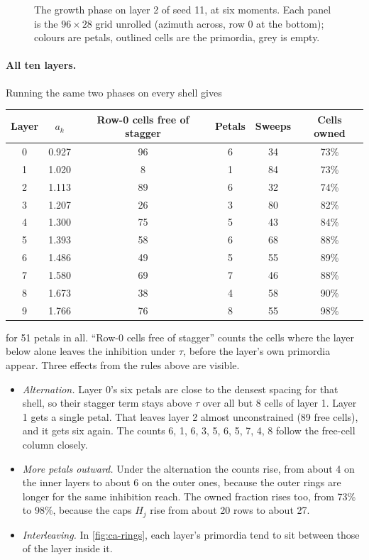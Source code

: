 \begin{figure}[ht]
\centering

\caption{The growth phase on layer 2 of seed 11, at six moments. Each panel is
the $96\times28$ grid unrolled (azimuth across, row 0 at the bottom); colours
are petals, outlined cells are the primordia, grey is empty.}
\label{fig:ca-sweeps}
\end{figure}

\paragraph{All ten layers.} Running the same two phases on every shell gives
\begin{center}\small
\begin{tabular}{@{}cccccc@{}}
\toprule
Layer & $a_k$ & Row-0 cells free of stagger & Petals & Sweeps & Cells owned \\
\midrule
0 & 0.927 & 96 & 6 & 34 & 73\% \\
1 & 1.020 & 8 & 1 & 84 & 73\% \\
2 & 1.113 & 89 & 6 & 32 & 74\% \\
3 & 1.207 & 26 & 3 & 80 & 82\% \\
4 & 1.300 & 75 & 5 & 43 & 84\% \\
5 & 1.393 & 58 & 6 & 68 & 88\% \\
6 & 1.486 & 49 & 5 & 55 & 89\% \\
7 & 1.580 & 69 & 7 & 46 & 88\% \\
8 & 1.673 & 38 & 4 & 58 & 90\% \\
9 & 1.766 & 76 & 8 & 55 & 98\% \\
\bottomrule
\end{tabular}
\end{center}
for 51 petals in all. ``Row-0 cells free of stagger'' counts the cells where
the layer below alone leaves the inhibition under $\tau$, before the layer's
own primordia appear. Three effects from the rules above are visible.
\begin{itemize}[leftmargin=*]
\item \emph{Alternation.} Layer 0's six petals are close to the densest
  spacing for that shell, so their stagger term stays above $\tau$ over all
  but 8 cells of layer 1. Layer 1 gets a single petal. That leaves layer 2
  almost unconstrained (89 free cells), and it gets six again. The counts
  6, 1, 6, 3, 5, 6, 5, 7, 4, 8 follow the free-cell column closely.
\item \emph{More petals outward.} Under the alternation the counts rise, from
  about 4 on the inner layers to about 6 on the outer ones, because the outer
  rings are longer for the same inhibition reach. The owned fraction rises
  too, from 73\% to 98\%, because the caps $H_j$ rise from about 20 rows to
  about 27.
\item \emph{Interleaving.} In \cref{fig:ca-rings}, each layer's primordia tend
  to sit between those of the layer inside it.
\end{itemize}
